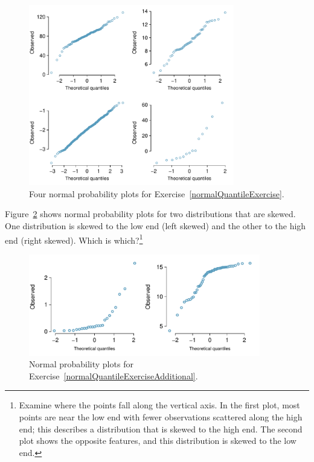 \begin{figure}[H]
\centering
\includegraphics[width=0.8\textwidth]{03/figures/normalQuantileExer/normalQuantileExer}
\caption{Four normal probability plots for Exercise~\ref{normalQuantileExercise}.}
\label{normalQuantileExer}
\end{figure}

\begin{exercise} \label{normalQuantileExerciseAdditional}
Figure~\ref{normalQuantileExerAdditional} shows normal probability plots for two distributions that are skewed. One distribution is skewed to the low end (left skewed) and the other to the high end (right skewed). Which is which?\footnote{Examine where the points fall along the vertical axis. In the first plot, most points are near the low end with fewer observations scattered along the high end; this describes a distribution that is skewed to the high end. The second plot shows the opposite features, and this distribution is skewed to the low end.}
\end{exercise}

\begin{figure}[H]
\centering
\includegraphics[width=0.9\textwidth]{03/figures/normalQuantileExer/normalQuantileExerAdditional}
\caption{Normal probability plots for Exercise~\ref{normalQuantileExerciseAdditional}.}
\label{normalQuantileExerAdditional}
\end{figure}


